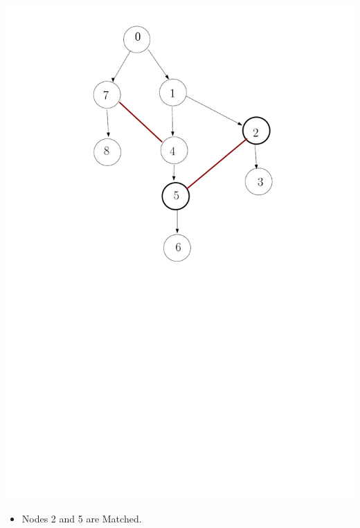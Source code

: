 \documentclass[12pt]{beamer}
\begin{document}
\begin{frame}[plain]
  \includegraphics[scale=0.3]{syncPoints2.pdf}
  \begin{itemize}
  \item Nodes 2 and 5 are Matched.
  \end{itemize}
\end{frame}
\end{document}
